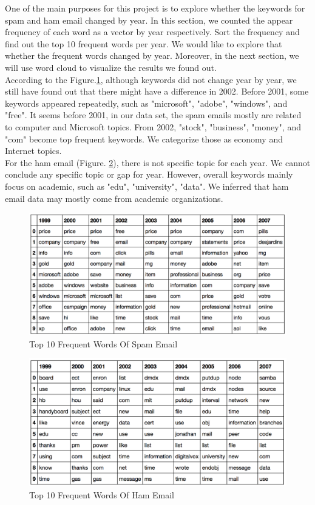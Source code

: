 
One of the main purposes for this project is to explore whether the keywords for spam and ham email changed by year. In this section, we counted the appear frequency of each word as a vector by year respectively. Sort the frequency and find out the top 10 frequent words per year. We would like to explore that whether the frequent words changed by year. Moreover, in the next section, we will use word cloud to visualize the results we found out.\\

According to the Figure.\ref{topwordspam}, although keywords did not change year by year, we still have found out that there might have a difference in 2002. Before 2001, some keywords appeared repeatedly, such as "microsoft", "adobe", "windows", and "free". It seems before 2001, in our data set, the spam emails mostly are related to computer and Microsoft topics. From 2002, "stock", "business", "money", and  "com" become top frequent keywords. We categorize those as economy and Internet topics. \\

For the ham email (Figure. \ref{topwordham}), there is not specific topic for each year. We cannot conclude any specific topic or gap for year. However, overall keywords mainly focus on academic, such as "edu", "university", "data". We inferred that ham email data may mostly come from academic organizations.\\

\begin{figure}[H]
    \centering
    \includegraphics[width=13cm]{./plots/top_word_spam.png}
    \caption{Top 10 Frequent Words Of Spam Email}
    \label{topwordspam}
\end{figure}


\begin{figure}[H]
    \centering
    \includegraphics[width=13cm]{./plots/top_word_ham.png}
    \caption{Top 10 Frequent Words Of Ham Email}
    \label{topwordham}
\end{figure}


